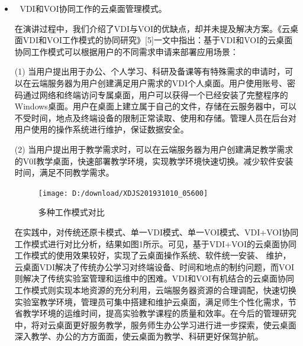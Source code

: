 \documentclass{article}
\begin{document}
\begin{itemize}
    \item 	VDI和VOI协同工作的云桌面管理模式。\par
    在演讲过程中，我们介绍了VDI与VOI的优缺点，却并未提及解决方案。《云桌面VDI和VOI工作模式的协同研究》[5]一文中指出：基于VDI和VOI的云桌面协同工作模式可以根据用户的不同需求申请来部署应用场景：\par
    (1) 当用户提出用于办公、个人学习、科研及备课等有特殊需求的申请时，可以在云端服务器为用户创建满足用户需求的VDI个人桌面。用户使用账号、密码通过网络和终端访问专属桌面，用户可以获得一个已经安装了完整程序的Windows桌面。用户在桌面上建立属于自己的文件，存储在云服务器中，可以不受时间，地点及终端设备的限制正常读取、使用和存储。管理人员在后台对用户使用的操作系统进行维护，保证数据安全。\par (2) 当用户提出用于教学需求时，可以在云端服务器为用户创建满足教学需求的V0I教学桌面，快速部署教学环境，实现教学环境快速切换。减少软件安装 时间，满足不同教学需求。\par
    \begin{figure}[h]
    	\centering
    	\texttt{[image: D:/download/XDJS201931010\_05600]}
    	\caption{多种工作模式对比}
    	\label{fig:xdjs20193101005600}
    \end{figure}
    
    在实践中，对传统还原卡模式、单一VDI模式、单一VOI模式、VDI+VOI协同工作模式进行对比分析，结果如图1所示。可见，基于VDI+VOI的云桌面协同工作模式的使用效果较好，实现了云桌面操作系统、软件统一安装、 维护，云桌面VDI解决了传统办公学习对终端设备、时间和地点的制约问题，而VOI则解决了传统实验室管理和运维中的困难。VDI和VOI有机结合的云桌面协同工作模式则实现本地资源的充分利用，云端服务器资源的合理调配，快速切换实验室教学环境，管理员可集中搭建和维护云桌面，满足师生个性化需求，节省教学环境的运维时间，提高实验教学课程的质量和效率。在今后的管理研究中，将对云桌面更好服务教学，服务师生办公学习进行进一步探索，使云桌面深入教学、办公的方方面面，使云桌面为教学、科研更好保驾护航。\par






\end{itemize}
\end{document}
